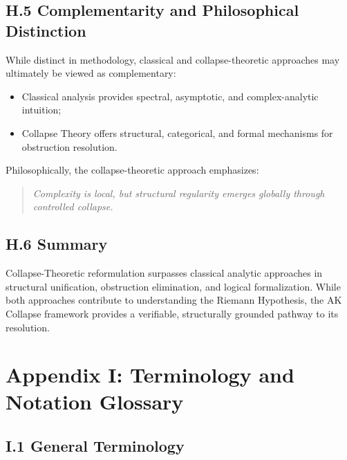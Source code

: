 \documentclass[11pt]{article}
\begin{document}
\subsection*{H.5 Complementarity and Philosophical Distinction}

While distinct in methodology, classical and collapse-theoretic approaches may ultimately be viewed as complementary:

\begin{itemize}
    \item Classical analysis provides spectral, asymptotic, and complex-analytic intuition;
    \item Collapse Theory offers structural, categorical, and formal mechanisms for obstruction resolution.
\end{itemize}

Philosophically, the collapse-theoretic approach emphasizes:

\begin{quote}
\textit{Complexity is local, but structural regularity emerges globally through controlled collapse.}
\end{quote}

\subsection*{H.6 Summary}

Collapse-Theoretic reformulation surpasses classical analytic approaches in structural unification, obstruction elimination, and logical formalization. While both approaches contribute to understanding the Riemann Hypothesis, the AK Collapse framework provides a verifiable, structurally grounded pathway to its resolution.



\section*{Appendix I: Terminology and Notation Glossary}

\subsection*{I.1 General Terminology}
\end{document}
